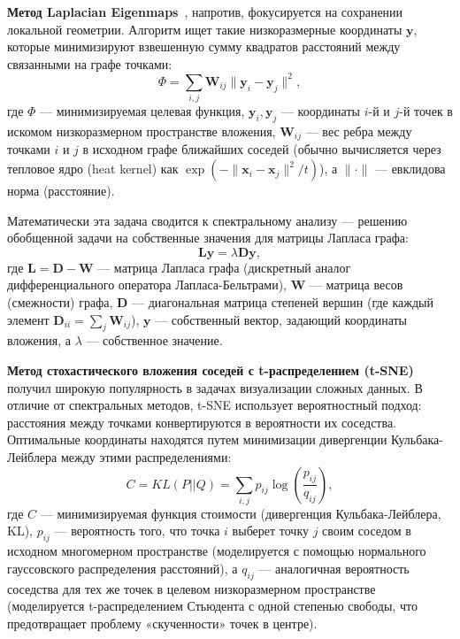 \textbf{Метод Laplacian Eigenmaps}~\cite{belkin2003laplacian}, напротив, фокусируется на сохранении локальной геометрии. Алгоритм ищет такие низкоразмерные координаты $\mathbf{y}$, которые минимизируют взвешенную сумму квадратов расстояний между связанными на графе точками:
\begin{equation}
	\Phi = \sum_{i,j} \mathbf{W}_{ij} \|\mathbf{y}_i - \mathbf{y}_j\|^2,
\end{equation}
где $\Phi$ --- минимизируемая целевая функция, $\mathbf{y}_i, \mathbf{y}_j$ --- координаты $i$-й и $j$-й точек в искомом низкоразмерном пространстве вложения, $\mathbf{W}_{ij}$ --- вес ребра между точками $i$ и $j$ в исходном графе ближайших соседей (обычно вычисляется через тепловое ядро (heat kernel) как $\exp(-\|\mathbf{x}_i - \mathbf{x}_j\|^2 / t)$), а $\|\cdot\|$ --- евклидова норма (расстояние).

Математически эта задача сводится к спектральному анализу --- решению обобщенной задачи на собственные значения для матрицы Лапласа графа:
\begin{equation}
	\mathbf{L} \mathbf{y} = \lambda \mathbf{D} \mathbf{y},
\end{equation}
где $\mathbf{L} = \mathbf{D} - \mathbf{W}$ --- матрица Лапласа графа (дискретный аналог дифференциального оператора Лапласа-Бельтрами), $\mathbf{W}$ --- матрица весов (смежности) графа, $\mathbf{D}$ --- диагональная матрица степеней вершин (где каждый элемент $\mathbf{D}_{ii} = \sum_j \mathbf{W}_{ij}$), $\mathbf{y}$ --- собственный вектор, задающий координаты вложения, а $\lambda$ --- собственное значение.

\textbf{Метод стохастического вложения соседей с t-распределением (t-SNE)}~\cite{maaten2008tsne} получил широкую популярность в задачах визуализации сложных данных. В отличие от спектральных методов, t-SNE использует вероятностный подход: расстояния между точками конвертируются в вероятности их соседства. Оптимальные координаты находятся путем минимизации дивергенции Кульбака-Лейблера между этими распределениями:
\begin{equation}
	C = KL(P||Q) = \sum_{i,j} p_{ij} \log\left(\frac{p_{ij}}{q_{ij}}\right),
\end{equation}
где $C$ --- минимизируемая функция стоимости (дивергенция Кульбака-Лейблера, KL), $p_{ij}$ --- вероятность того, что точка $i$ выберет точку $j$ своим соседом в исходном многомерном пространстве (моделируется с помощью нормального гауссовского распределения расстояний), а $q_{ij}$ --- аналогичная вероятность соседства для тех же точек в целевом низкоразмерном пространстве (моделируется t-распределением Стьюдента с одной степенью свободы, что предотвращает проблему «скученности» точек в центре).

